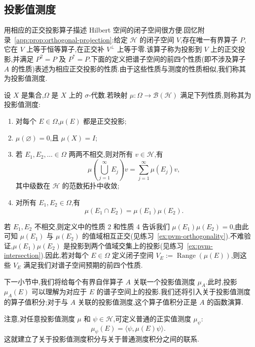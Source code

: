 \subsection{投影值测度}
\label{subsec:projection-valued-measures}

用相应的正交投影算子描述 Hilbert 空间的闭子空间很方便.回忆附录~\ref{app:prop:orthogonal-projection}:给定 \(\mathcal{H}\) 的闭子空间 \(V\),存在唯一有界算子 \(P\),它在 \(V\) 上等于恒等算子,在正交补 \(V^{\perp}\) 上等于零.该算子称为投影到 \(V\) 上的正交投影,并满足 \(P^{2}=P\) 及 \(P^{*}=P\).下面的定义把谱子空间的前四个性质(即不涉及算子 \(A\) 的性质)表述为相应正交投影的性质.由于这些性质与测度的性质相似,我们称其为投影值测度.

\begin{definition}[投影值测度]\label{def:projection-valued-measure}
设 \(X\) 是集合,\(\Omega\) 是 \(X\) 上的 \(\sigma\)-代数.若映射 \(\mu:\Omega\to\mathcal{B}(\mathcal{H})\) 满足下列性质,则称其为投影值测度:
\begin{enumerate}
\item 对每个 \(E\in\Omega\),\(\mu(E)\) 都是正交投影;
\item \(\mu(\varnothing)=0\),且 \(\mu(X)=I\);
\item 若 \(E_{1},E_{2},\ldots\in\Omega\) 两两不相交,则对所有 \(v\in\mathcal{H}\),有
\[
\mu\left(\bigcup_{j=1}^{\infty}E_{j}\right)v
=\sum_{j=1}^{\infty}\mu(E_{j})v,
\]
其中级数在 \(\mathcal{H}\) 的范数拓扑中收敛;
\item 对所有 \(E_{1},E_{2}\in\Omega\),有
\[
\mu(E_{1}\cap E_{2})=\mu(E_{1})\mu(E_{2}).
\]
\end{enumerate}
\end{definition}

若 \(E_{1},E_{2}\) 不相交,则定义中的性质 2 和性质 4 告诉我们 \(\mu(E_{1})\mu(E_{2})=0\),由此可知 \(\mu(E_{1})\) 与 \(\mu(E_{2})\) 的值域相互正交(见练习~\ref{ex:pvm-orthogonality}).不难验证,\(\mu(E_{1})\mu(E_{2})\) 是投影到两个值域交集上的投影(见练习~\ref{ex:pvm-intersection}).因此,若对每个 \(E\in\Omega\) 定义闭子空间 \(V_{E}:=\operatorname{Range}(\mu(E))\),则这些 \(V_{E}\) 满足我们对谱子空间预期的前四个性质.

下一小节中,我们将给每个有界自伴算子 \(A\) 关联一个投影值测度 \(\mu_{A}\).此时,投影 \(\mu_{A}(E)\) 可以理解为对应于 \(E\) 的谱子空间上的投影.我们还将引入关于投影值测度的算子值积分;对于与 \(A\) 关联的投影值测度,这个算子值积分正是 \(A\) 的函数演算.

注意,对任意投影值测度 \(\mu\) 和 \(\psi\in\mathcal{H}\),可定义普通的正实值测度 \(\mu_{\psi}\):
\[
\mu_{\psi}(E)=\langle\psi,\mu(E)\psi\rangle.
\label{eq:pvm-scalar-measure}
\]
这就建立了关于投影值测度积分与关于普通测度积分之间的联系.

